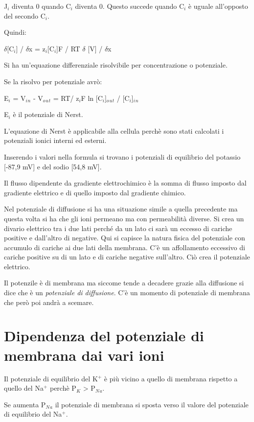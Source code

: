 \documentclass[]{article}
\begin{document}
J\(_i\) diventa 0 quando C\(_i\) diventa 0. Questo succede quando
C\(_i\) è uguale all'opposto del secondo C\(_i\).

Quindi:

\(\delta\){[}C\(_i\){]} / \(\delta\)x = z\(_i\){[}C\(_i\){]}F / RT
\(\delta\) {[}V{]} / \(\delta\)x

Si ha un'equazione differenziale risolvibile per concentrazione o
potenziale.

Se la risolvo per potenziale avrò:

E\(_i\) = V\(_i\)\(_n\) - V\(_o\)\(_u\)\(_t\) = RT/ z\(_i\)F ln
{[}C\(_i\){]}\(_o\)\(_u\)\(_t\) / {[}C\(_i\){]}\(_i\)\(_n\)

E\(_i\) è il potenziale di Nerst.

L'equazione di Nerst è applicabile alla cellula perchè sono stati
calcolati i potenziali ionici interni ed esterni.

Inserendo i valori nella formula si trovano i potenziali di equilibrio
del potassio {[}-87,9 mV{]} e del sodio {[}54,8 mV{]}.

Il flusso dipendente da gradiente elettrochimico è la somma di flusso
imposto dal gradiente elettrico e di quello imposto dal gradiente
chimico.

Nel potenziale di diffusione si ha una situazione simile a quella
precedente ma questa volta si ha che gli ioni permeano ma con
permeabilità diverse. Si crea un divario elettrico tra i due lati perché
da un lato ci sarà un eccesso di cariche positive e dall'altro di
negative. Qui si capisce la natura fisica del potenziale con accumulo di
cariche ai due lati della membrana. C'è un affollamento eccessivo di
cariche positive su di un lato e di cariche negative sull'altro. Ciò
crea il potenziale elettrico.

Il potenzile è di membrana ma siccome tende a decadere grazie alla
diffusione si dice che è un \emph{potenziale di diffusione}. C'è un
momento di potenziale di membrana che però poi andrà a scemare.

\section{Dipendenza del potenziale di membrana dai vari
ioni}\label{dipendenza-del-potenziale-di-membrana-dai-vari-ioni}

Il potenziale di equilibrio del K\(^+\) è più vicino a quello di
membrana rispetto a quello del Na\(^+\) perchè P\(_K\) \textgreater{}
P\(_N\)\(_a\).

Se aumenta P\(_N\)\(_a\) il potenziale di membrana si sposta verso il
valore del potenziale di equilibrio del Na\(^+\).
\end{document}
